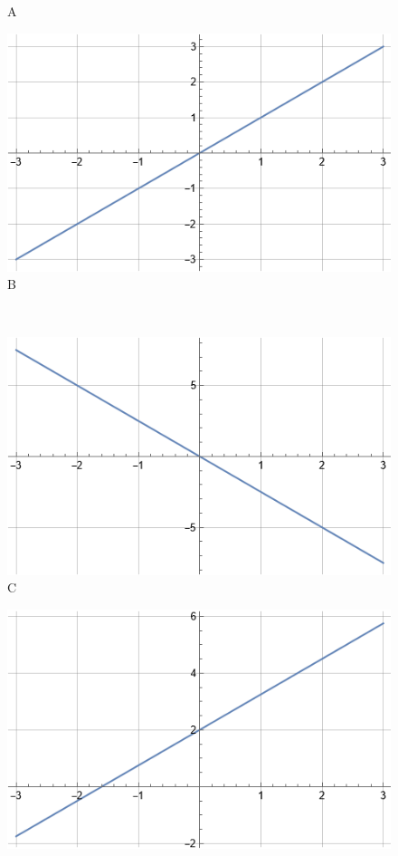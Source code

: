 \documentclass[14pt]{exam}
\begin{document}
\begin{questions}
\begin{minipage}{0.4\linewidth}
\begin{figure}[H]
    \caption{A}
\end{figure}
\end{minipage}
\begin{minipage}{0.4\linewidth}
\begin{figure}[H]
    \includegraphics[scale=0.5]{Imagenes/Examen_Repaso_2023_03_07_02.png}
    \caption{B}
\end{figure}
\end{minipage}
\\
\begin{minipage}{0.4\linewidth}
\begin{figure}[H]
    \includegraphics[scale=0.5]{Imagenes/Examen_Repaso_2023_03_07_03.png}
    \caption{C}
\end{figure}
\end{minipage}
\begin{minipage}{0.4\linewidth}
\begin{figure}[H]
    \includegraphics[scale=0.5]{Imagenes/Examen_Repaso_2023_03_07_04.png}

\end{figure}
\end{minipage}
\end{questions}
\end{document}
